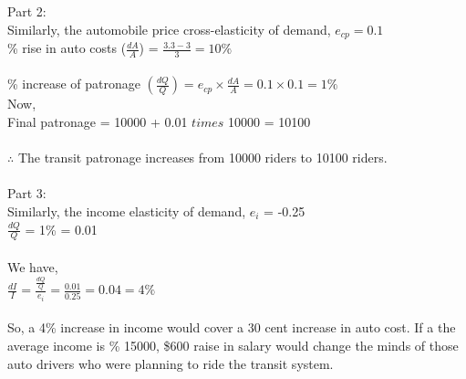 Part 2:\\
Similarly, the automobile price cross-elasticity of demand,
$e_{cp} = 0.1$\\
\% rise in auto costs ($\frac{dA}{A}$) = $\frac{3.3 - 3}{3} = 10\%$\\\\
\% increase of patronage $(\frac{dQ}{Q}) = e_{cp} \times \frac{dA}{A} = 0.1 \times 0.1 = 1\% $\\
Now,\\
Final patronage = 10000 + 0.01 $times$ 10000 = 10100\\\\
$\therefore$ The transit patronage increases from 10000 riders to 10100 riders.\\\\
Part 3:\\
Similarly, the income elasticity of demand,
$e_i$ = -0.25\\
$\frac{dQ}{Q}$ = 1\% = 0.01\\\\
We have,\\
$\frac{dI}{I} = \frac{\frac{dQ}{Q}}{e_i} = \frac{0.01}{0.25} = 0.04 = 4\%$\\\\
So, a 4\% increase in income would cover a 30 cent increase in auto cost. If a the average income is \% 15000, \$600 raise in salary would change the minds of those auto drivers who were planning to ride the transit system.
